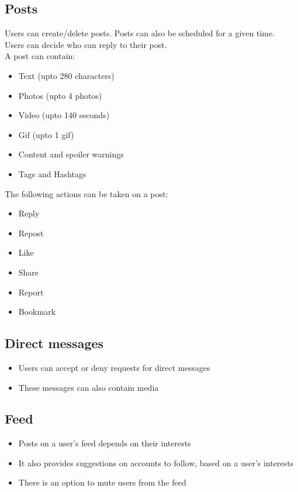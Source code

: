 \documentclass[journal,12pt,onecolumn]{IEEEtran}
\begin{document}
\subsection*{\textbf{Posts}}
\noindent Users can create/delete posts. Posts can also be scheduled for a given time. \\
Users can decide who can reply to their post. \\
A post can contain:
\begin{itemize}
    \item Text (upto 280 characters)
    \item Photos (upto 4 photos)
    \item Video (upto 140 seconds)
    \item Gif (upto 1 gif)
    \item Content and spoiler warnings
    \item Tags and Hashtags
\end{itemize}
\pagebreak
The following actions can be taken on a post:
\begin{itemize}
    \item Reply 
    \item Repost
    \item Like 
    \item Share
    \item Report
    \item Bookmark
\end{itemize}
%
\subsection*{\textbf{Direct messages}}
\begin{itemize}
    \item Users can accept or deny requests for direct messages
    \item These messages can also contain media
\end{itemize}
%
\subsection*{\textbf{Feed}}
\begin{itemize}
    \item Posts on a user's feed depends on their interests
    \item It also provides suggestions on accounts to follow, based on a user's interests
    \item There is an option to mute users from the feed
\end{itemize}
%
\end{document}

